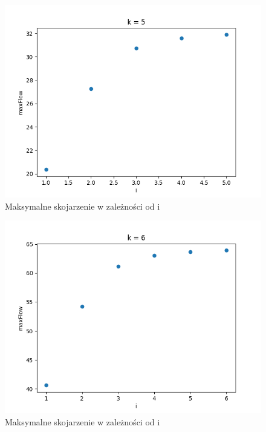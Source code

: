 \documentclass{report}
\begin{document}
\begin{figure}[H]
    \centering
    \includegraphics[scale=0.55]{../ex2/plots/k5.png}
    \caption{Maksymalne skojarzenie w zależności od i}
\end{figure}
\begin{figure}[H]
    \centering
    \includegraphics[scale=0.55]{../ex2/plots/k6.png}
    \caption{Maksymalne skojarzenie w zależności od i}
\end{figure}
\end{document}
